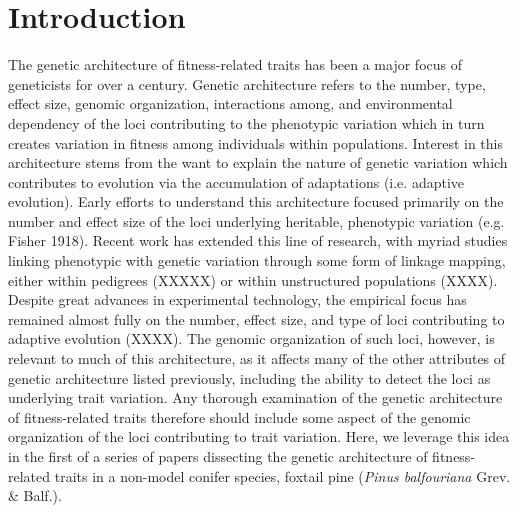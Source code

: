 \documentclass[11pt]{article}
\begin{document}
\section{Introduction}
The genetic architecture of fitness-related traits has been a major focus of geneticists for over a century. 
Genetic architecture refers to the number, type, effect size, genomic organization, interactions among, and environmental dependency 
of the loci contributing to the phenotypic variation which in turn creates variation in fitness among individuals within populations.
Interest in this architecture stems from the want to explain the nature of genetic variation which contributes to evolution 
via the accumulation of adaptations (i.e. adaptive evolution). Early efforts to understand 
this architecture focused primarily on the number and effect size of the loci underlying heritable, phenotypic variation (e.g. Fisher 1918). 
Recent work has extended this line of research, with myriad studies linking phenotypic with genetic variation through 
some form of linkage mapping, either within pedigrees (XXXXX) or within unstructured populations (XXXX). Despite great
advances in experimental technology, the empirical focus has remained almost fully on the number, effect size, and type of loci
contributing to adaptive evolution (XXXX). The genomic organization of such loci, however, is relevant to much of this architecture, as 
it affects many of the other attributes of genetic architecture listed previously, including the ability to detect the loci as underlying trait variation. 
Any thorough examination of the genetic architecture of fitness-related traits therefore should include some aspect of the genomic organization of the loci
contributing to trait variation. Here, we leverage this idea in the first of a series of papers dissecting the genetic architecture of fitness-related
traits in a non-model conifer species, foxtail pine (\textit{Pinus balfouriana} Grev. \& Balf.).
\end{document}

